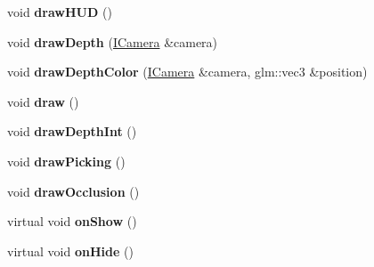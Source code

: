 \begin{DoxyCompactItemize}
\item 
void {\bfseries draw\+H\+UD} ()\hypertarget{classflw_1_1flf_1_1Scene_a77e0074c305dace29bbc871437f39f4a}{}\label{classflw_1_1flf_1_1Scene_a77e0074c305dace29bbc871437f39f4a}

\item 
void {\bfseries draw\+Depth} (\hyperlink{classflw_1_1flf_1_1ICamera}{I\+Camera} \&camera)\hypertarget{classflw_1_1flf_1_1Scene_ac2ba9bb56505a843ad14fac010784592}{}\label{classflw_1_1flf_1_1Scene_ac2ba9bb56505a843ad14fac010784592}

\item 
void {\bfseries draw\+Depth\+Color} (\hyperlink{classflw_1_1flf_1_1ICamera}{I\+Camera} \&camera, glm\+::vec3 \&position)\hypertarget{classflw_1_1flf_1_1Scene_ae16cb4f3294ed4164db2f7ed89ab3796}{}\label{classflw_1_1flf_1_1Scene_ae16cb4f3294ed4164db2f7ed89ab3796}

\item 
void {\bfseries draw} ()\hypertarget{classflw_1_1flf_1_1Scene_a0fcbe99eab93306a09ecd875a485f058}{}\label{classflw_1_1flf_1_1Scene_a0fcbe99eab93306a09ecd875a485f058}

\item 
void {\bfseries draw\+Depth\+Int} ()\hypertarget{classflw_1_1flf_1_1Scene_a4b60d0d59a34032b377c3fb588928291}{}\label{classflw_1_1flf_1_1Scene_a4b60d0d59a34032b377c3fb588928291}

\item 
void {\bfseries draw\+Picking} ()\hypertarget{classflw_1_1flf_1_1Scene_afe9a1c362ecb88659c29c21508152e11}{}\label{classflw_1_1flf_1_1Scene_afe9a1c362ecb88659c29c21508152e11}

\item 
void {\bfseries draw\+Occlusion} ()\hypertarget{classflw_1_1flf_1_1Scene_a2b43d217669e21a2048aab75761cbfe6}{}\label{classflw_1_1flf_1_1Scene_a2b43d217669e21a2048aab75761cbfe6}

\item 
virtual void {\bfseries on\+Show} ()\hypertarget{classflw_1_1flf_1_1Scene_a85ec0fc6f17e504134c8be933fa6e230}{}\label{classflw_1_1flf_1_1Scene_a85ec0fc6f17e504134c8be933fa6e230}

\item 
virtual void {\bfseries on\+Hide} ()\hypertarget{classflw_1_1flf_1_1Scene_a8552db5ba8145e7b848f95bd4dd5bf2a}{}\label{classflw_1_1flf_1_1Scene_a8552db5ba8145e7b848f95bd4dd5bf2a}

\end{DoxyCompactItemize}
